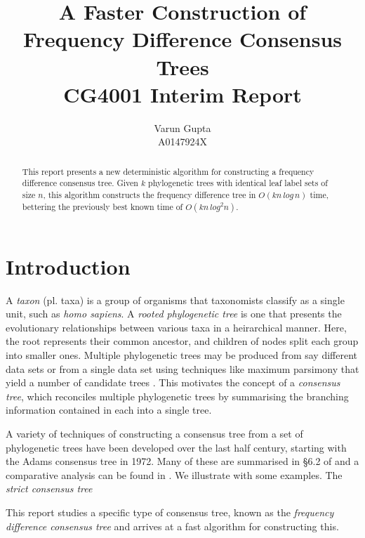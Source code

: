 \documentclass{article}
\title{A Faster Construction of Frequency Difference Consensus Trees\\CG4001 Interim Report}
\author{Varun Gupta\\A0147924X}
\begin{document}
    \maketitle

    \begin{abstract}
        This report presents a new deterministic algorithm for constructing a frequency difference consensus tree. Given $k$ phylogenetic trees with identical leaf label sets of size $n$, this algorithm constructs the frequency difference tree in $O(kn\,log\,n)$ time, bettering the previously best known time of $O(kn\,log^2n)$.
    \end{abstract}

    \section{Introduction}
    \label{sec:introduction}

    A \textit{taxon} (pl. taxa) is a group of organisms that taxonomists classify as a single unit, such as \textit{homo sapiens}. A \textit{rooted phylogenetic tree} is one that presents the evolutionary relationships between various taxa in a heirarchical manner. Here, the root represents their common ancestor, and children of nodes split each group into smaller ones. Multiple phylogenetic trees may be produced from say different data sets or from a single data set using techniques like maximum parsimony that yield a number of candidate trees \cite{bryant1997hunting}. This motivates the concept of a \textit{consensus tree}, which reconciles multiple phylogenetic trees by summarising the branching information contained in each into a single tree.

    A variety of techniques of constructing a consensus tree from a set of phylogenetic trees have been developed over the last half century, starting with the Adams consensus tree \cite{adams1972consensus} in 1972. Many of these are summarised in \S 6.2 of \cite{bryant1997hunting} and a comparative analysis can be found in \cite{bryant2003classification}. We illustrate with some examples. The \textit{strict consensus tree} 

    This report studies a specific type of consensus tree, known as the \textit{frequency difference consensus tree} and arrives at a fast algorithm for constructing this.
\end{document}
